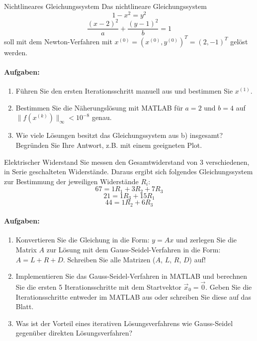 \begin{example2}{Nichtlineares Gleichungssystem}
Das nichtlineare Gleichungssystem
$$1 - x^2 = y^2$$
$$\frac{(x-2)^2}{a} + \frac{(y-1)^2}{b} = 1$$
soll mit dem Newton-Verfahren mit $x^{(0)} = (x^{(0)}, y^{(0)})^T = (2,-1)^T$ gelöst werden.

\paragraph{Aufgaben:}
\begin{enumerate}
    \item Führen Sie den ersten Iterationsschritt manuell aus und bestimmen Sie $x^{(1)}$.
    
    \item Bestimmen Sie die Näherungslösung mit MATLAB für $a = 2$ und $b = 4$ auf $\|f(x^{(k)})\|_\infty < 10^{-8}$ genau.
    
    \item Wie viele Lösungen besitzt das Gleichungssystem aus b) insgesamt? Begründen Sie Ihre Antwort, z.B. mit einem geeigneten Plot.
\end{enumerate}
\end{example2}

\begin{example2}{Elektrischer Widerstand}
Sie messen den Gesamtwiderstand von 3 verschiedenen, in Serie geschalteten Widerstände. Daraus ergibt sich folgendes Gleichungssystem zur Bestimmung der jeweiligen Widerstände $R_i$:
$$67 = 1R_1 + 3R_2 + 7R_3$$
$$21 = 1R_3 + 15R_1$$
$$44 = 1R_2 + 6R_3$$

\paragraph{Aufgaben:}
\begin{enumerate}
    \item Konvertieren Sie die Gleichung in die Form: $y = Ax$ und zerlegen Sie die Matrix $A$ zur Lösung mit dem Gauss-Seidel-Verfahren in die Form: $A = L + R + D$. Schreiben Sie alle Matrizen ($A$, $L$, $R$, $D$) auf!
    
    \item Implementieren Sie das Gauss-Seidel-Verfahren in MATLAB und berechnen Sie die ersten 5 Iterationsschritte mit dem Startvektor $\vec{x}_0 = \vec{0}$. Geben Sie die Iterationsschritte entweder im MATLAB aus oder schreiben Sie diese auf das Blatt.
    
    \item Was ist der Vorteil eines iterativen Lösungsverfahrens wie Gauss-Seidel gegenüber direkten Lösungsverfahren?
\end{enumerate}
\end{example2}


